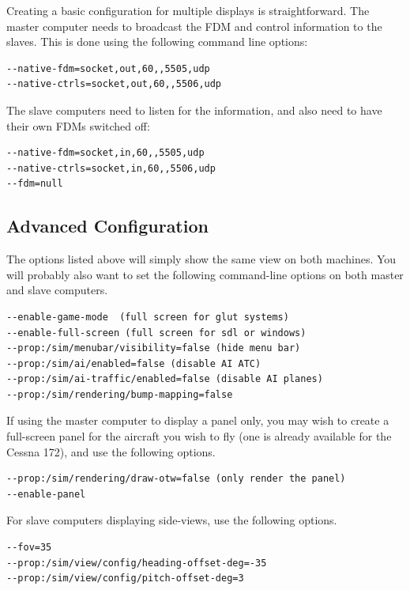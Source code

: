 Creating a basic configuration for multiple displays is straightforward. The
master computer needs to broadcast the FDM and control information to the slaves.
This is done using the following command line options:

\begin{verbatim}
--native-fdm=socket,out,60,,5505,udp
--native-ctrls=socket,out,60,,5506,udp
\end{verbatim}

The slave computers need to listen for the information, and also need to have
their own FDMs switched off:

\begin{verbatim}
--native-fdm=socket,in,60,,5505,udp
--native-ctrls=socket,in,60,,5506,udp
--fdm=null
\end{verbatim}

\subsection{Advanced Configuration}

The options listed above will simply show the same view on both machines. You will probably also want to set the
following command-line options on both master and slave computers.

\begin{verbatim}
--enable-game-mode  (full screen for glut systems)
--enable-full-screen (full screen for sdl or windows)
--prop:/sim/menubar/visibility=false (hide menu bar)
--prop:/sim/ai/enabled=false (disable AI ATC)
--prop:/sim/ai-traffic/enabled=false (disable AI planes)
--prop:/sim/rendering/bump-mapping=false
\end{verbatim}

If using the master computer to display a panel only, you may wish to create a full-screen panel for the
aircraft you wish to fly (one is already available for the Cessna 172), and use the following options.

\begin{verbatim}
--prop:/sim/rendering/draw-otw=false (only render the panel)
--enable-panel
\end{verbatim}

For slave computers displaying side-views, use the following options.

\begin{verbatim}
--fov=35
--prop:/sim/view/config/heading-offset-deg=-35
--prop:/sim/view/config/pitch-offset-deg=3
\end{verbatim}


